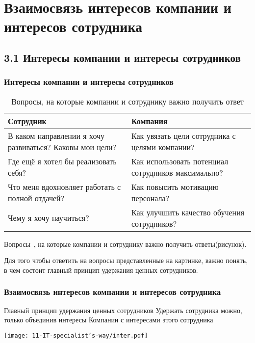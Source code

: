 \documentclass{../industrial-development}
\begin{document}

\section{Взаимосвязь интересов компании и интересов сотрудника }

\subsection{3.1 Интересы компании и интересы сотрудников }

\begin{frame} \frametitle{Интересы компании и интересы сотрудников}


 \begin{table}[H]
\caption{\label{tab:canonsummary} Вопросы, на которые компании и сотруднику важно получить ответ }
\begin{center}
\begin{tabular}{|p{0.5\linewidth}|p{0.5\linewidth}|}
\hline
\textbf{Сотрудник} & \textbf{Компания} \\
\hline
В каком направлении я хочу развиваться? Каковы мои цели? &  Как увязать цели сотрудника с целями компании? \\
\hline
Где ещё я хотел бы реализовать себя?  & Как использовать потенциал сотрудников максимально? \\
\hline
Что меня вдохновляет работать с полной отдачей? & Как повысить мотивацию персонала? \\
\hline
Чему я хочу научиться? & Как улучшить качество обучения сотрудников? \\
\hline
\end{tabular}
\end{center}
\end{table} 

\end{frame}


\lecturenotes

Вопросы~\cite{IPl}, на которые компании и сотруднику важно получить ответы(рисунок).

Для того чтобы ответить на вопросы представленные на картинке, важно понять, в чем состоит главный принцип удержания ценных сотрудников.


\begin{frame} \frametitle{Взаимосвязь интересов компании и интересов сотрудника}
  \begin{block}{Главный принцип удержания ценных сотрудников}
Удержать сотрудника можно, только объединив интересы Компании с интересами этого сотрудника
  \end{block}
  \centerline{\texttt{[image: 11-IT-specialist's-way/inter.pdf]}}
\end{frame}
\end{document}

